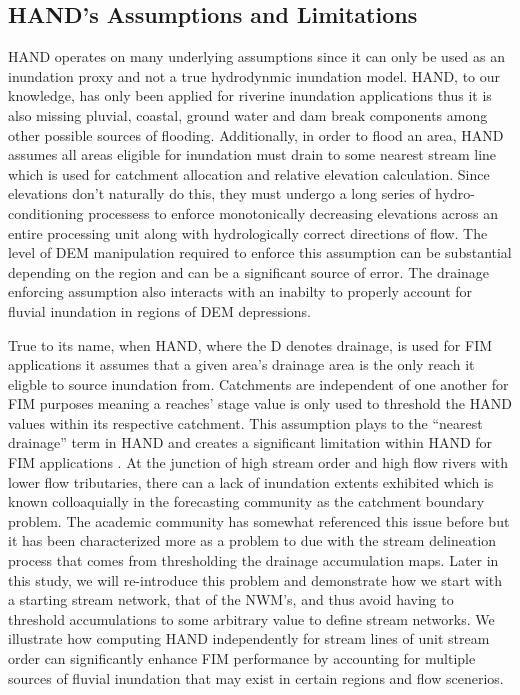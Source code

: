 \subsection{HAND's Assumptions and Limitations}
\label{sssec:hand_assumptions_limitations}
%
HAND operates on many underlying assumptions since it can only be used as an inundation proxy and not a true hydrodynmic inundation model.
HAND, to our knowledge, has only been applied for riverine inundation applications thus it is also missing pluvial, coastal, ground water and dam break components among other possible sources of flooding.
Additionally, in order to flood an area, HAND assumes all areas eligible for inundation must drain to some nearest stream line which is used for catchment allocation and relative elevation calculation.
Since elevations don't naturally do this, they must undergo a long series of hydro-conditioning processess to enforce monotonically decreasing elevations across an entire processing unit along with hydrologically correct directions of flow.
The level of DEM manipulation required to enforce this assumption can be substantial depending on the region and can be a significant source of error.
The drainage enforcing assumption also interacts with an inabilty to properly account for fluvial inundation in regions of DEM depressions.

True to its name, when HAND, where the D denotes drainage, is used for FIM applications it assumes that a given area's drainage area is the only reach it eligble to source inundation from.
Catchments are independent of one another for FIM purposes meaning a reaches' stage value is only used to threshold the HAND values within its respective catchment.
This assumption plays to the ``nearest drainage'' term in HAND and creates a significant limitation within HAND for FIM applications \cite{zhang2018comparative,mcgehee2016modified,li2020evaluation}.
At the junction of high stream order and high flow rivers with lower flow tributaries, there can a lack of inundation extents exhibited which is known colloaquially in the forecasting community as the catchment boundary problem.
The academic community has somewhat referenced this issue before but it has been characterized more as a problem to due with the stream delineation process that comes from thresholding the drainage accumulation maps.
Later in this study, we will re-introduce this problem and demonstrate how we start with a starting stream network, that of the NWM's, and thus avoid having to threshold accumulations to some arbitrary value to define stream networks.
We illustrate how computing HAND independently for stream lines of unit stream order can significantly enhance FIM performance by accounting for multiple sources of fluvial inundation that may exist in certain regions and flow scenerios.
%
